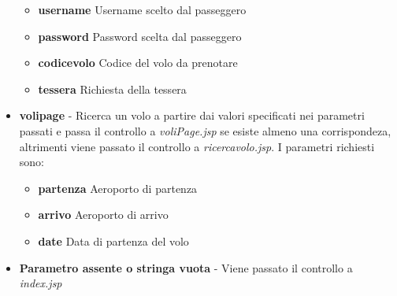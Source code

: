 \documentclass[a4paper,10pt]{article}
\begin{document}
\begin{itemize}
\begin{itemize}
				      \item \textbf{username} Username scelto dal passeggero
				      \item \textbf{password} Password scelta dal passeggero
				      \item \textbf{codicevolo} Codice del volo da prenotare
				      \item \textbf{tessera} Richiesta della tessera
				     \end{itemize}
 \item \textbf{volipage} - Ricerca un volo a partire dai valori specificati nei parametri passati e passa il controllo a \textit{voliPage.jsp} se esiste almeno una corrispondeza, altrimenti
		  viene passato il controllo a \textit{ricercavolo.jsp}.
		  I parametri richiesti sono:
		  \begin{itemize}
		   \item \textbf{partenza} Aeroporto di partenza
		   \item \textbf{arrivo} Aeroporto di arrivo
		   \item \textbf{date} Data di partenza del volo
		  \end{itemize}
\item \textbf{Parametro assente o stringa vuota} - Viene passato il controllo a \textit{index.jsp}
 \end{itemize}


 
 
\end{document}
